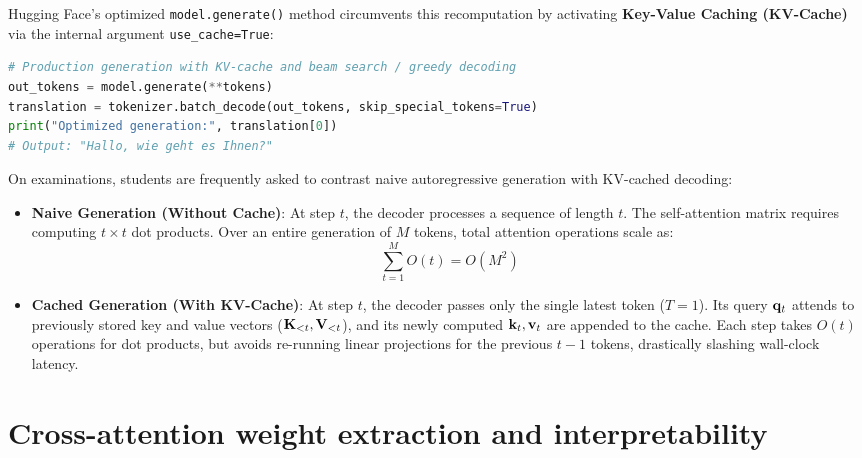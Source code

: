 \documentclass[../labs.tex]{subfiles}
\begin{document}
Hugging Face's optimized \texttt{model.generate()} method circumvents this recomputation by activating \textbf{Key-Value Caching (KV-Cache)} via the internal argument \texttt{use\_cache=True}:

\begin{lstlisting}[language=Python, caption={High-level optimized generation using \texttt{model.generate()} (Cells 87--88).}, label={lst:lab02_hf_generate}]
# Production generation with KV-cache and beam search / greedy decoding
out_tokens = model.generate(**tokens)
translation = tokenizer.batch_decode(out_tokens, skip_special_tokens=True)
print("Optimized generation:", translation[0])
# Output: "Hallo, wie geht es Ihnen?"
\end{lstlisting}

\begin{examinsight}
On examinations, students are frequently asked to contrast naive autoregressive generation with KV-cached decoding:
\begin{itemize}
    \item \textbf{Naive Generation (Without Cache)}: At step $t$, the decoder processes a sequence of length $t$. The self-attention matrix requires computing $t \times t$ dot products. Over an entire generation of $M$ tokens, total attention operations scale as:
    \begin{equation}
        \sum_{t=1}^M O(t) = O(M^2)
    \end{equation}
    \item \textbf{Cached Generation (With KV-Cache)}: At step $t$, the decoder passes only the single latest token ($T=1$). Its query $\mathbf{q}_t$ attends to previously stored key and value vectors ($\mathbf{K}_{<t}, \mathbf{V}_{<t}$), and its newly computed $\mathbf{k}_t, \mathbf{v}_t$ are appended to the cache. Each step takes $O(t)$ operations for dot products, but avoids re-running linear projections for the previous $t-1$ tokens, drastically slashing wall-clock latency.
\end{itemize}
\end{examinsight}

\section{Cross-attention weight extraction and interpretability}
\label{sec:lab02_cross_attention}
\end{document}
